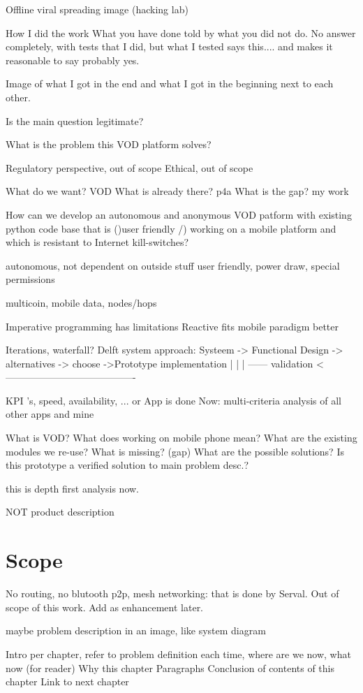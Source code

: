 Offline viral spreading image (hacking lab)


How I did the work
What you have done told by what you did not do.
No answer completely, with tests that I did, but what I tested says this.... and makes it reasonable to say probably yes.


Image of what I got in the end and what I got in the beginning next to each other.


Is the main question legitimate?


What is the problem this VOD platform solves?


Regulatory perspective, out of scope
Ethical, out of scope


What do we want? VOD
What is already there? p4a
What is the gap? my work

How can we develop an autonomous and anonymous VOD patform with existing python code base that is ()user friendly /) working on a mobile platform and which is resistant to Internet kill-switches?

autonomous, not dependent on outside stuff
user friendly, power draw, special permissions

multicoin, mobile data, nodes/hops



Imperative programming has limitations
Reactive fits mobile paradigm better


Iterations, waterfall?
Delft system approach:
Systeem -> Functional Design -> alternatives -> choose ->Prototype implementation
																									 |
|																									|
------			 validation				 <----------------------------------------

KPI 's, speed, availability, ...
or
App is done
Now: multi-criteria analysis of all other apps and mine



What is VOD?
What does working on mobile phone mean?
What are the existing modules we re-use?
What is missing? (gap)
What are the possible solutions?
Is this prototype a verified solution to main problem desc.?


this is depth first analysis now.

NOT product description

\section{Scope}
No routing, no blutooth p2p, mesh networking: that is done by Serval. Out of scope of this work. Add as enhancement later.



maybe problem description in an image, like system diagram



Intro per chapter, refer to problem definition each time, where are we now, what now (for reader)
Why this chapter
Paragraphs
Conclusion of contents of this chapter
Link to next chapter


